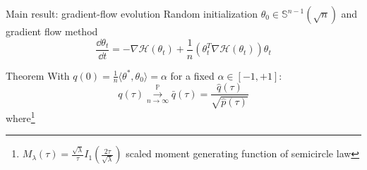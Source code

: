\documentclass[10pt]{beamer}
\begin{document}
\begin{frame}{Main result: gradient-flow evolution}
  Random initialization $\theta_0\in \mathbb{S}^{n-1}(\sqrt  n)$ and gradient flow method
  \begin{equation*}
    \frac{\dd \theta_t}{\dd t} = - \nabla \mathcal H(\theta_t)
    + \frac{1}{n} \left( \theta_t^T \nabla \mathcal H(\theta_t)  \right) \theta_t  
  \end{equation*}

  \begin{block}{Theorem \cite{pmlr-v134-bodin21a}}
      With $q(0) = \frac{1}{n} \langle\theta^*, \theta_{0}\rangle = \alpha$ for a fixed $\alpha \in [-1, +1]$:
      \begin{equation*}
      q(\tau) \overset{\mathbb{P}}{ \underset{n \to\infty}{\longrightarrow}} \bar q(\tau) = \frac{\hat q(\tau)}{\sqrt{\hat p(\tau)}}
      \end{equation*}
      where\footnote{$M_\lambda(\tau) = \frac{\sqrt\lambda}{\tau} I_1(\frac{2\tau}{\sqrt{\lambda}})$ scaled moment generating function of semicircle law} 

  \vspace*{-0.25cm}
  \end{block}
  \vspace*{0.5cm}
\end{frame}
\end{document}
